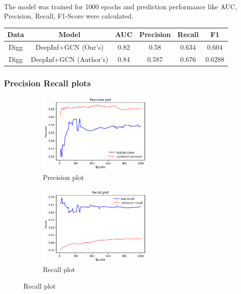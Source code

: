 \paragraph{} The model was trained for 1000 epochs and prediction performance like AUC, Precision, Recall, F1-Score were calculated.
\begin{center}
    \begin{tabular}{ |c|c|c|c|c|c| } 
     \hline
     \textbf{Data} & \textbf{Model} & \textbf{AUC} & \textbf{Precision} & \textbf{Recall} & \textbf{F1} \\ 
     \hline
     Digg & DeepInf+GCN (Our's) & 0.82 & 0.58 & 0.634 & 0.604\\ 
     Digg & DeepInf+GCN (Author's) & 0.84 & 0.587 & 0.676 & 0.6288\\ 
     \hline
    \end{tabular}
    \end{center}
\subsubsection{Precision Recall plots}
\begin{figure}[h]
    \centering
    \begin{subfigure}[b]{0.5\textwidth}
                \includegraphics[width=\textwidth,height=4cm]{tex/img/precision_plot.png}
                \caption{Precision plot}
        \end{subfigure}%
        \hfill
    \begin{subfigure}[b]{0.5\textwidth}
                \includegraphics[width=\textwidth,height=4cm]{tex/img/recall_plot.png}
                \caption{Recall plot}
       \end{subfigure}%
    \end{figure}
